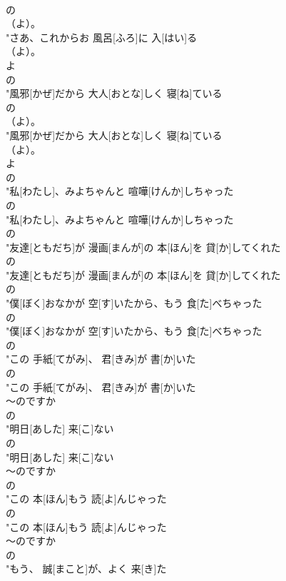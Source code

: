 \documentclass[8pt]{extreport}
\begin{document}
\begin{CJK}{UTF8}{min}
\\	の
\\	（よ）。
\\	"さあ、これからお 風呂[ふろ]に 入[はい]る
\\	（よ）。
\\	よ 
\\	の
\\	"風邪[かぜ]だから 大人[おとな]しく 寝[ね]ている
\\	の
\\	（よ）。
\\	"風邪[かぜ]だから 大人[おとな]しく 寝[ね]ている
\\	（よ）。
\\	よ 
\\	の
\\	"私[わたし]、みよちゃんと 喧嘩[けんか]しちゃった
\\	の
\\	"私[わたし]、みよちゃんと 喧嘩[けんか]しちゃった
\\	の
\\	"友達[ともだち]が 漫画[まんが]の 本[ほん]を 貸[か]してくれた
\\	の
\\	"友達[ともだち]が 漫画[まんが]の 本[ほん]を 貸[か]してくれた
\\	の
\\	"僕[ぼく]おなかが 空[す]いたから、もう 食[た]べちゃった
\\	の
\\	"僕[ぼく]おなかが 空[す]いたから、もう 食[た]べちゃった
\\	の
\\	"この 手紙[てがみ]、 君[きみ]が 書[か]いた
\\	の
\\	"この 手紙[てがみ]、 君[きみ]が 書[か]いた
\\	～のですか 
\\	の
\\	"明日[あした] 来[こ]ない
\\	の
\\	"明日[あした] 来[こ]ない
\\	～のですか 
\\	の
\\	"この 本[ほん]もう 読[よ]んじゃった
\\	の
\\	"この 本[ほん]もう 読[よ]んじゃった
\\	～のですか 
\\	の
\\	"もう、 誠[まこと]が、よく 来[き]た

\end{CJK}
\end{document}
